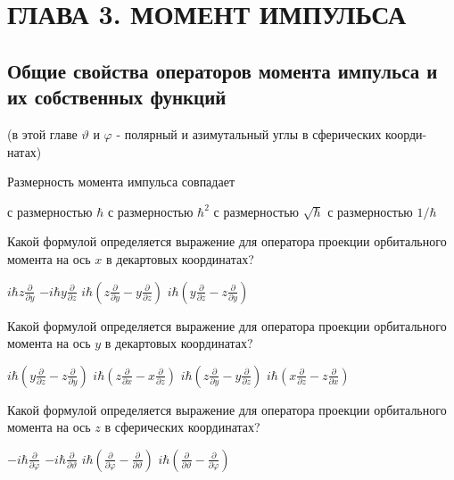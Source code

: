 \documentclass[11pt,a4paper]{exam}
\begin{document}
\section{ ГЛАВА 3. МОМЕНТ ИМПУЛЬСА }
\subsection{ Общие свойства операторов момента импульса и их собственных функций }
(в этой главе $\vartheta $ и $\varphi $ - полярный и азимутальный углы в сферических коорди-натах)

\begin{questions}

\question Размерность момента импульса совпадает
\begin{choices}
\choice с размерностью $\hbar $       
\choice с размерностью ${\hbar ^2}$ 
\choice с размерностью $\sqrt \hbar  $         
\choice с размерностью $1/\hbar $
\end{choices}

\question Какой формулой определяется выражение для оператора проекции орбитального момента на ось $x$ в декартовых координатах?
\begin{choices}
\choice $i\hbar z\frac{\partial }{{\partial y}}$     
\choice $ - i\hbar y\frac{\partial }{{\partial z}}$     
\choice $i\hbar \left( {z\frac{\partial }{{\partial y}} - y\frac{\partial }{{\partial z}}} \right)$     
\choice $i\hbar \left( {y\frac{\partial }{{\partial z}} - z\frac{\partial }{{\partial y}}} \right)$
\end{choices}

\question Какой формулой определяется выражение для оператора проекции орбитального момента на ось $y$ в декартовых координатах?
\begin{choices}
\choice $i\hbar \left( {y\frac{\partial }{{\partial z}} - z\frac{\partial }{{\partial y}}} \right)$  
\choice $i\hbar \left( {z\frac{\partial }{{\partial x}} - x\frac{\partial }{{\partial z}}} \right)$  
\choice $i\hbar \left( {z\frac{\partial }{{\partial y}} - y\frac{\partial }{{\partial z}}} \right)$  
\choice $i\hbar \left( {x\frac{\partial }{{\partial z}} - z\frac{\partial }{{\partial x}}} \right)$
\end{choices}

\question Какой формулой определяется выражение для оператора проекции орбитального момента на ось $z$ в сферических координатах?
\begin{choices}
\choice $ - i\hbar \frac{\partial }{{\partial \varphi }}$     
\choice $ - i\hbar \frac{\partial }{{\partial \vartheta }}$      
\choice $i\hbar \left( {\frac{\partial }{{\partial \varphi }} - \frac{\partial }{{\partial \vartheta }}} \right)$      
\choice $i\hbar \left( {\frac{\partial }{{\partial \vartheta }} - \frac{\partial }{{\partial \varphi }}} \right)$
\end{choices}


\end{questions}
\end{document}
